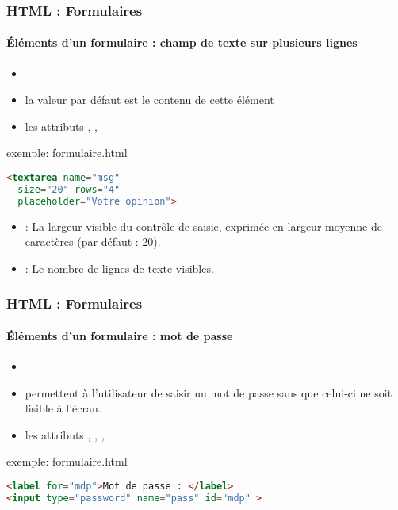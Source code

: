 \documentclass[xcolor=table]{beamer}
\begin{document}
\begin{frame}[fragile]
\frametitle{HTML : Formulaires}
\framesubtitle{Éléments d'un formulaire : champ de texte sur plusieurs lignes}

\begin{minipage}{0.59\textwidth} 
	\begin{itemize}
		\item {}
		\item la valeur par défaut est le contenu de cette élément
		\item les attributs , , 
	\end{itemize}
\end{minipage}
%
\begin{minipage}{0.4\textwidth}
\begin{exampleblock}{exemple: formulaire.html}
\lstset{escapeinside=**}
\scriptsize\bfseries\vspace{-6pt}
\begin{lstlisting}[language={html}]
<textarea name="msg"
  size="20" rows="4"
  placeholder="Votre opinion">
\end{lstlisting}\vspace{-6pt}
\end{exampleblock}
\end{minipage}

\begin{itemize}
	\item {}: La largeur visible du contrôle de saisie, exprimée en largeur moyenne de caractères (par défaut : 20).
	\item {} : Le nombre de lignes de texte visibles.
\end{itemize}

\end{frame}

\begin{frame}[fragile]
\frametitle{HTML : Formulaires}
\framesubtitle{Éléments d'un formulaire : mot de passe}

\begin{itemize}
	\item {}
	\item permettent à l'utilisateur de saisir un mot de passe sans que celui-ci ne soit lisible à l'écran. 
	\item les attributs , , ,  
\end{itemize}

\begin{exampleblock}{exemple: formulaire.html}
\lstset{escapeinside=**}
\scriptsize\bfseries\vspace{-6pt}
\begin{lstlisting}[language={html}]
<label for="mdp">Mot de passe : </label>
<input type="password" name="pass" id="mdp" >
\end{lstlisting}\vspace{-6pt}
\end{exampleblock}

\end{frame}
\end{document}
